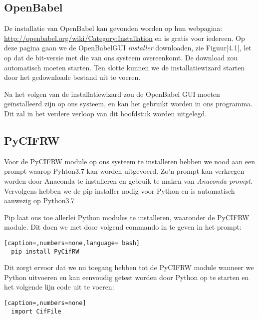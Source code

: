 \subsection{OpenBabel}  
De installatie van OpenBabel kan gevonden worden op hun webpagina: \url{http://openbabel.org/wiki/Category:Installation} en is gratis voor iedereen. Op deze pagina gaan we de OpenBabelGUI \textit{installer} downloaden, zie Figuur[4.1], let op dat de bit-versie met die van ons systeem overeenkomt. De download zou automatisch moeten starten. Ten slotte kunnen we de installatiewizard starten door het gedownloade bestand uit te voeren.
\par
Na het volgen van de installatiewizard zou de OpenBabel GUI moeten geïnstalleerd zijn op ons systeem, en kan het gebruikt worden in ons programma. Dit zal in het verdere verloop van dit hoofdstuk worden uitgelegd.

\subsection{PyCIFRW}
Voor de PyCIFRW module op ons systeem te installeren hebben we nood aan een prompt waarop Pyhton3.7 kan worden uitgevoerd. Zo'n prompt kan verkregen worden door Anaconda te installeren en gebruik te maken van \textit{Anaconda prompt}. Vervolgens hebben we de pip installer nodig voor Python en is automatisch aanwezig op Python3.7
\par 
Pip laat ons toe allerlei Python modules te installeren, waaronder de PyCIFRW module. Dit doen we met door volgend commando in te geven in het prompt:
\begin{lstlisting}[caption=,numbers=none,language= bash]
  pip install PyCifRW
\end{lstlisting}
Dit zorgt ervoor dat we nu toegang hebben tot de PyCIFRW module wanneer we Python uitvoeren en kan eenvoudig getest worden door Python op te starten en het volgende lijn code uit te voeren:
\begin{lstlisting}[caption=,numbers=none]
  import CifFile
\end{lstlisting}

